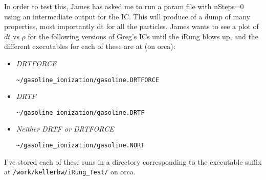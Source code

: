 \documentclass[11pt,letterpaper]{article}
\begin{document}
In order to test this, James has asked me to run a param file with
nSteps=0 using an intermediate output for the IC. This will produce of a
dump of many properties, most importantly dt for all the particles.
James wants to see a plot of $dt$ vs $\rho$ for the following versions
of Greg's ICs until the iRung blows up, and the different executables
for each of these are at (on orca):

\begin{itemize}
\item
  \emph{DRTFORCE}

  \texttt{\textasciitilde{}/gasoline\_ionization/gasoline.DRTFORCE}
\item
  \emph{DRTF}

  \texttt{\textasciitilde{}/gasoline\_ionization/gasoline.DRTF}
\item
  \emph{Neither DRTF or DRTFORCE}

  \texttt{\textasciitilde{}/gasoline\_ionization/gasoline.NORT}
\end{itemize}

I've stored each of these runs in a directory corresponding to the
executable suffix at \texttt{/work/kellerbw/iRung\_Test/} on orca.
\end{document}
